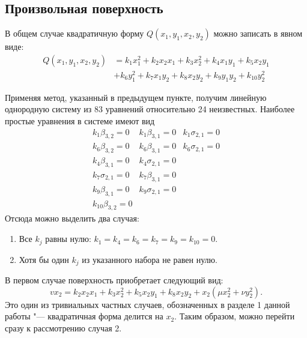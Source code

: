 \documentclass[../main.tex]{subfiles}
\begin{document}
\subsection{Произвольная поверхность}
В общем случае квадратичную форму $Q(x_1, y_1, x_2, y_2)$ можно записать в явном виде:
\begin{align*}
Q(x_1, y_1, x_2, y_2) &= k_1 x_1^2 + k_2 x_2 x_1 + k_3 x_2^2 + k_4 x_1 y_1 + k_5 x_2 y_1 \\
&+ k_6 y_1^2 + k_7 x_1 y_2 + k_8 x_2 y_2 + k_9 y_1 y_2 + k_{10} y_2^2
\end{align*}

Применяя метод, указанный в предыдущем пункте, получим линейную однородную систему из 83 уравнений относительно 24 неизвестных. Наиболее простые уравнения в системе имеют вид
\begin{equation}
\begin{matrix}
 k_1 \beta _{3,2}=0 &  k_1 \beta _{3,1}=0 &  k_1 \sigma _{2,1}=0 \\
 k_6 \beta _{3,2}=0 & k_6 \beta _{3,1}=0 & k_6 \sigma _{2,1}=0 \\
 k_4 \beta _{3,1}=0 &  k_4 \sigma _{2,1}=0 \\
 k_7 \sigma _{2,1}=0 & k_7 \beta _{3,1}=0 \\
 k_9 \beta _{3,1}=0 & k_9 \sigma _{2,1}=0 \\
 k_{10} \beta _{3,2}=0 &  &
\end{matrix}
\end{equation}
Отсюда можно выделить два случая:
\begin{enumerate}
	\item Все $k_j$ равны нулю: $k_1 = k_4 = k_6 = k_7 = k_9 = k_{10} = 0$.
	\item Хотя бы один $k_j$ из указанного набора не равен нулю.
\end{enumerate}
В первом случае поверхность приобретает следующий вид:
\begin{equation*}
v x_2 = k_2 x_2 x_1 + k_3 x_2^2 + k_5 x_2 y_1 + k_8 x_2 y_2 + x_2 (\mu x_2^2 + \nu y_2^2).
\end{equation*}
Это один из тривиальных частных случаев, обозначенных в разделе 1 данной работы "--- квадратичная форма делится на $x_2$. Таким образом, можно перейти сразу к рассмотрению случая 2.
\end{document}
